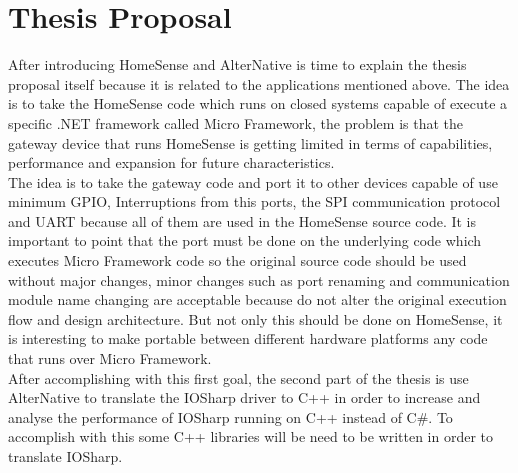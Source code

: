 \section{Thesis Proposal}\label{S:Proposal-Thesis-Proposal}
After introducing HomeSense and AlterNative is time to explain the thesis proposal itself because it is related to the applications mentioned above. The idea is to take the HomeSense code which runs on closed systems capable of execute a specific .NET framework called Micro Framework, the problem is that the gateway device that runs HomeSense is getting limited in terms of capabilities, performance and expansion for future characteristics.
\\
The idea is to take the gateway code and port it to other devices capable of use minimum GPIO, Interruptions from this ports, the SPI communication protocol and UART because all of them are used in the HomeSense source code. It is important to point that the port must be done on the underlying code which executes Micro Framework code so the original source code should be used without major changes, minor changes such as port renaming and communication module name changing are acceptable because do not alter the original execution flow and design architecture. But not only this should be done on HomeSense, it is interesting to make portable between different hardware platforms any code that runs over Micro Framework.
\\
After accomplishing with this first goal, the second part of the thesis is use AlterNative to translate the IOSharp driver to C++ in order to increase and analyse the performance of IOSharp running on C++ instead of C\#. To accomplish with this some C++ libraries will be need to be written in order to translate IOSharp.